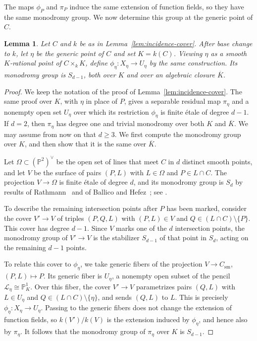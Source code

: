 \documentclass[10pt,a4paper]{amsart}
\newtheorem{lemma}[theorem]{Lemma}
\theoremstyle{definition}
\theoremstyle{remark}
\newcommand{\bP}{\mathbb{P}}
\begin{document}
The maps $\phi_P$ and $\pi_P$ induce the same extension of
function fields, so they have the same monodromy group.
We now determine this group at the generic point of $C$.

\begin{lemma}\label{lem:generic-projection-monodromy}
Let $C$ and $k$ be as in Lemma~\ref{lem:incidence-cover}. After base change to $k$, let $\eta$ be the generic point of $C$ and set $K=k(C)$. Viewing $\eta$ as a smooth $K$-rational point of $C\times_k K$, define $\phi_\eta\colon X_\eta\to U_\eta$ by the same construction. Its monodromy group is $S_{d-1}$, both over $K$ and over an algebraic closure $\overline K$.
\end{lemma}

\begin{proof}
We keep the notation of the proof of Lemma~\ref{lem:incidence-cover}. The same proof over $K$, with $\eta$ in place of $P$, gives a separable residual map $\pi_\eta$ and a nonempty open set $U_\eta$ over which its restriction $\phi_\eta$ is finite \'etale of degree $d-1$. If $d=2$, then $\pi_\eta$ has degree one and trivial monodromy over both $K$ and $\overline K$. We may assume from now on that $d\geq3$. We first compute the monodromy group over $K$, and then show that it is the same over $\overline K$.

Let $\Omega\subset(\bP^2)^\vee$ be the open set of lines that meet $C$ in $d$ distinct smooth points, and let $V$ be the surface of pairs $(P,L)$ with $L\in\Omega$ and $P\in L\cap C$. The projection $V\to\Omega$ is finite \'etale of degree $d$, and its monodromy group is $S_d$ by results of Rathmann~\cite{Rat87} and of Ballico and Hefez~\cite{BH86}; see \cite[Theorem~2]{Ent21}. 

To describe the remaining intersection points after $P$ has
been marked, consider the cover $V'\to V$ of triples $(P,Q,L)$
with $(P,L)\in V$ and $Q\in(L\cap C)\setminus\{P\}$.
This cover has degree $d-1$. Since $V$ marks one of the $d$
intersection points, the monodromy group of $V'\to V$ is the
stabilizer $S_{d-1}$ of that point in $S_d$, acting on the
remaining $d-1$ points.

To relate this cover to $\phi_\eta$, we take generic fibers
of the projection $V\to C_{\mathrm{sm}}$, $(P,L)\mapsto P$.
Its generic fiber is $U_\eta$, a nonempty open subset of the pencil
$\mathcal L_\eta\cong\bP^1_K$. Over this fiber, the cover
$V'\to V$ parametrizes pairs $(Q,L)$ with $L\in U_\eta$ and
$Q\in(L\cap C)\setminus\{\eta\}$, and sends $(Q,L)$ to $L$.
This is precisely $\phi_\eta\colon X_\eta\to U_\eta$.
Passing to the generic fibers does not change the extension
of function fields, so $k(V')/k(V)$ is the extension induced
by $\phi_\eta$, and hence also by $\pi_\eta$.
It follows that the monodromy group of $\pi_\eta$ over $K$ is $S_{d-1}$.


\end{proof}
\end{document}
